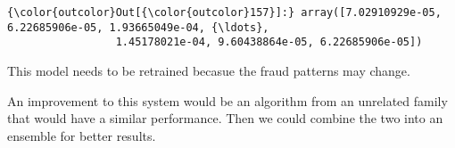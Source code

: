 \documentclass[11pt]{article}
\begin{document}
\begin{Verbatim}[commandchars=\\\{\}]
{\color{outcolor}Out[{\color{outcolor}157}]:} array([7.02910929e-05, 6.22685906e-05, 1.93665049e-04, {\ldots},
                 1.45178021e-04, 9.60438864e-05, 6.22685906e-05])
\end{Verbatim}
            
    This model needs to be retrained becasue the fraud patterns may change.

An improvement to this system would be an algorithm from an unrelated
family that would have a similar performance. Then we could combine the
two into an ensemble for better results.


    
    
    
    
\end{document}
